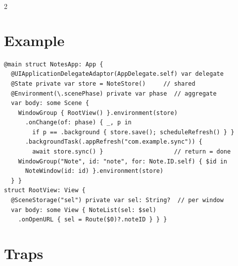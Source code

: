 \documentclass[8pt]{extarticle}
\begin{document}
\begin{multicols}{2}
\section{Example}
\begin{lstlisting}[language=SwiftSheet]
@main struct NotesApp: App {
  @UIApplicationDelegateAdaptor(AppDelegate.self) var delegate
  @State private var store = NoteStore()     // shared
  @Environment(\.scenePhase) private var phase  // aggregate
  var body: some Scene {
    WindowGroup { RootView() }.environment(store)
      .onChange(of: phase) { _, p in
        if p == .background { store.save(); scheduleRefresh() } }
      .backgroundTask(.appRefresh("com.example.sync")) {
        await store.sync() }                    // return = done
    WindowGroup("Note", id: "note", for: Note.ID.self) { $id in
      NoteWindow(id: id) }.environment(store)
  } }
struct RootView: View {
  @SceneStorage("sel") private var sel: String?  // per window
  var body: some View { NoteList(sel: $sel)
    .onOpenURL { sel = Route($0)?.noteID } } }
\end{lstlisting}

\section{Traps}
\begin{itemize}
\end{itemize}


\end{multicols}
\end{document}
